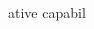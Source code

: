 \documentclass[a4paper]{article}
\begin{document}
\begin{multicols*}{2}
\begin{footnotesize}
ative capabil
\end{footnotesize}
\end{multicols*}
\end{document}

